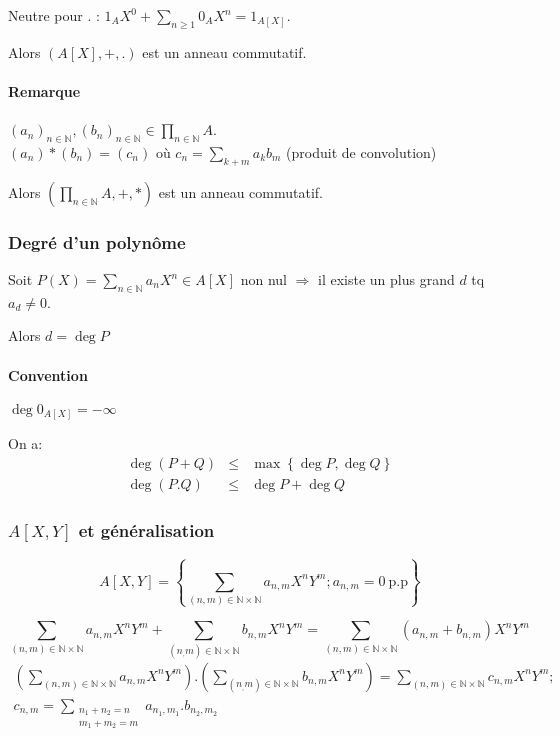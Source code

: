 \documentclass[reqno,a4paper,10pt]{report}
\newcommand{\set}[1]{\left\lbrace #1 \right\rbrace} %
\newcommand{\IN}{\ensuremath{\mathbb{N}}\xspace} %
\newcommand{\so}{\Rightarrow}
\begin{document}
Neutre pour $.$ : $\displaystyle 1_A X^0 + \sum_{n \geq 1} 0_A X^n =
1_{A[X]}$.

Alors $\left( A[X], +, . \right)$ est un anneau commutatif.

\paragraph{Remarque} $ (a_n)_{n \in \IN}, (b_n)_{n \in \IN} \in
\prod_{n \in \IN} A$.\\
$(a_n) * (b_n) = (c_n)$ où $\displaystyle c_n = \sum_{k+m} a_k b_m$ (produit
de convolution)

Alors $\displaystyle\left( \prod_{n\in \IN} A , +, * \right)$ est un anneau
commutatif.

\subsubsection{Degré d'un polynôme}
Soit $P(X)=\sum_{n \in \IN } a_n X^n \in A[X]$ non nul $\so$ il existe un plus
grand $d$ tq $a_d \neq 0$.

Alors $d=\deg P$

\paragraph{Convention} $\deg 0_{A[X]} = -\infty$

On a:
\begin{eqnarray*}
\deg (P+Q) &\leq& \max \set{\deg P, \deg Q}\\
\deg (P.Q) &\leq& \deg P + \deg Q
\end{eqnarray*}

\subsubsection{$A[X, Y]$ et généralisation}
\[A[X, Y] = \set{\sum_{(n,m) \in \IN \times \IN} a_{n,m} X^n Y^m; a_{n,m} = 0
\ \text{p.p}}\]

\[\sum_{(n,m) \in \IN \times \IN} a_{n,m} X^n Y^m + \sum_{(n_,m) \in \IN
\times \IN} b_{n,m} X^n Y^m = \sum_{(n,m) \in \IN \times \IN} (a_{n,m} +
b_{n,m}) X^n Y^m\]
\begin{multline*}
\left(\sum_{(n,m) \in \IN \times \IN} a_{n,m} X^n Y^m\right)
. \left(\sum_{(n_,m) \in \IN \times \IN} b_{n,m} X^n Y^m\right) = \sum_{(n,m)
\in \IN \times \IN} c_{n,m} X^n Y^m ; \\
c_{n,m} = \sum_{\substack{ n_1+n_2 =n\\
  m_1 + m_2 = m} } a_{n_1,m_1} . b_{n_2, m_2}
\end{multline*}
\end{document}
